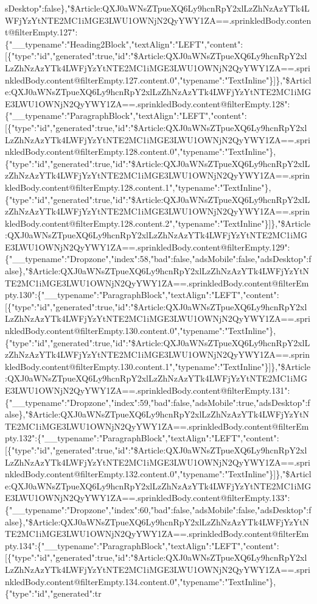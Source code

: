 sDesktop":false\},"\$Article:QXJ0aWNsZTpueXQ6Ly9hcnRpY2xlLzZhNzAzYTk4LWFjYzYtNTE2MC1iMGE3LWU1OWNjN2QyYWY1ZA==.sprinkledBody.content@filterEmpty.127":\{"\_\_typename":"Heading2Block","textAlign":"LEFT","content":{[}\{"type":"id","generated":true,"id":"\$Article:QXJ0aWNsZTpueXQ6Ly9hcnRpY2xlLzZhNzAzYTk4LWFjYzYtNTE2MC1iMGE3LWU1OWNjN2QyYWY1ZA==.sprinkledBody.content@filterEmpty.127.content.0","typename":"TextInline"\}{]}\},"\$Article:QXJ0aWNsZTpueXQ6Ly9hcnRpY2xlLzZhNzAzYTk4LWFjYzYtNTE2MC1iMGE3LWU1OWNjN2QyYWY1ZA==.sprinkledBody.content@filterEmpty.128":\{"\_\_typename":"ParagraphBlock","textAlign":"LEFT","content":{[}\{"type":"id","generated":true,"id":"\$Article:QXJ0aWNsZTpueXQ6Ly9hcnRpY2xlLzZhNzAzYTk4LWFjYzYtNTE2MC1iMGE3LWU1OWNjN2QyYWY1ZA==.sprinkledBody.content@filterEmpty.128.content.0","typename":"TextInline"\},\{"type":"id","generated":true,"id":"\$Article:QXJ0aWNsZTpueXQ6Ly9hcnRpY2xlLzZhNzAzYTk4LWFjYzYtNTE2MC1iMGE3LWU1OWNjN2QyYWY1ZA==.sprinkledBody.content@filterEmpty.128.content.1","typename":"TextInline"\},\{"type":"id","generated":true,"id":"\$Article:QXJ0aWNsZTpueXQ6Ly9hcnRpY2xlLzZhNzAzYTk4LWFjYzYtNTE2MC1iMGE3LWU1OWNjN2QyYWY1ZA==.sprinkledBody.content@filterEmpty.128.content.2","typename":"TextInline"\}{]}\},"\$Article:QXJ0aWNsZTpueXQ6Ly9hcnRpY2xlLzZhNzAzYTk4LWFjYzYtNTE2MC1iMGE3LWU1OWNjN2QyYWY1ZA==.sprinkledBody.content@filterEmpty.129":\{"\_\_typename":"Dropzone","index":58,"bad":false,"adsMobile":false,"adsDesktop":false\},"\$Article:QXJ0aWNsZTpueXQ6Ly9hcnRpY2xlLzZhNzAzYTk4LWFjYzYtNTE2MC1iMGE3LWU1OWNjN2QyYWY1ZA==.sprinkledBody.content@filterEmpty.130":\{"\_\_typename":"ParagraphBlock","textAlign":"LEFT","content":{[}\{"type":"id","generated":true,"id":"\$Article:QXJ0aWNsZTpueXQ6Ly9hcnRpY2xlLzZhNzAzYTk4LWFjYzYtNTE2MC1iMGE3LWU1OWNjN2QyYWY1ZA==.sprinkledBody.content@filterEmpty.130.content.0","typename":"TextInline"\},\{"type":"id","generated":true,"id":"\$Article:QXJ0aWNsZTpueXQ6Ly9hcnRpY2xlLzZhNzAzYTk4LWFjYzYtNTE2MC1iMGE3LWU1OWNjN2QyYWY1ZA==.sprinkledBody.content@filterEmpty.130.content.1","typename":"TextInline"\}{]}\},"\$Article:QXJ0aWNsZTpueXQ6Ly9hcnRpY2xlLzZhNzAzYTk4LWFjYzYtNTE2MC1iMGE3LWU1OWNjN2QyYWY1ZA==.sprinkledBody.content@filterEmpty.131":\{"\_\_typename":"Dropzone","index":59,"bad":false,"adsMobile":true,"adsDesktop":false\},"\$Article:QXJ0aWNsZTpueXQ6Ly9hcnRpY2xlLzZhNzAzYTk4LWFjYzYtNTE2MC1iMGE3LWU1OWNjN2QyYWY1ZA==.sprinkledBody.content@filterEmpty.132":\{"\_\_typename":"ParagraphBlock","textAlign":"LEFT","content":{[}\{"type":"id","generated":true,"id":"\$Article:QXJ0aWNsZTpueXQ6Ly9hcnRpY2xlLzZhNzAzYTk4LWFjYzYtNTE2MC1iMGE3LWU1OWNjN2QyYWY1ZA==.sprinkledBody.content@filterEmpty.132.content.0","typename":"TextInline"\}{]}\},"\$Article:QXJ0aWNsZTpueXQ6Ly9hcnRpY2xlLzZhNzAzYTk4LWFjYzYtNTE2MC1iMGE3LWU1OWNjN2QyYWY1ZA==.sprinkledBody.content@filterEmpty.133":\{"\_\_typename":"Dropzone","index":60,"bad":false,"adsMobile":false,"adsDesktop":false\},"\$Article:QXJ0aWNsZTpueXQ6Ly9hcnRpY2xlLzZhNzAzYTk4LWFjYzYtNTE2MC1iMGE3LWU1OWNjN2QyYWY1ZA==.sprinkledBody.content@filterEmpty.134":\{"\_\_typename":"ParagraphBlock","textAlign":"LEFT","content":{[}\{"type":"id","generated":true,"id":"\$Article:QXJ0aWNsZTpueXQ6Ly9hcnRpY2xlLzZhNzAzYTk4LWFjYzYtNTE2MC1iMGE3LWU1OWNjN2QyYWY1ZA==.sprinkledBody.content@filterEmpty.134.content.0","typename":"TextInline"\},\{"type":"id","generated":tr